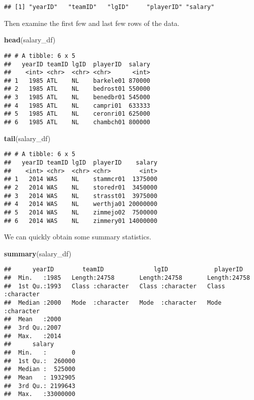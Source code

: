 \documentclass[]{article}
\newenvironment{Shaded}{\begin{snugshade}}{\end{snugshade}}
\newcommand{\KeywordTok}[1]{\textcolor[rgb]{0.13,0.29,0.53}{\textbf{#1}}}
\newcommand{\NormalTok}[1]{#1}
\begin{document}
\begin{verbatim}
## [1] "yearID"   "teamID"   "lgID"     "playerID" "salary"
\end{verbatim}

Then examine the first few and last few rows of the data.

\begin{Shaded}
\begin{Highlighting}[]
\KeywordTok{head}\NormalTok{(salary_df)}
\end{Highlighting}
\end{Shaded}

\begin{verbatim}
## # A tibble: 6 x 5
##   yearID teamID lgID  playerID  salary
##    <int> <chr>  <chr> <chr>      <int>
## 1   1985 ATL    NL    barkele01 870000
## 2   1985 ATL    NL    bedrost01 550000
## 3   1985 ATL    NL    benedbr01 545000
## 4   1985 ATL    NL    campri01  633333
## 5   1985 ATL    NL    ceronri01 625000
## 6   1985 ATL    NL    chambch01 800000
\end{verbatim}

\begin{Shaded}
\begin{Highlighting}[]
\KeywordTok{tail}\NormalTok{(salary_df)}
\end{Highlighting}
\end{Shaded}

\begin{verbatim}
## # A tibble: 6 x 5
##   yearID teamID lgID  playerID    salary
##    <int> <chr>  <chr> <chr>        <int>
## 1   2014 WAS    NL    stammcr01  1375000
## 2   2014 WAS    NL    storedr01  3450000
## 3   2014 WAS    NL    strasst01  3975000
## 4   2014 WAS    NL    werthja01 20000000
## 5   2014 WAS    NL    zimmejo02  7500000
## 6   2014 WAS    NL    zimmery01 14000000
\end{verbatim}

We can quickly obtain some summary statistics.

\begin{Shaded}
\begin{Highlighting}[]
\KeywordTok{summary}\NormalTok{(salary_df)}
\end{Highlighting}
\end{Shaded}

\begin{verbatim}
##      yearID        teamID              lgID             playerID        
##  Min.   :1985   Length:24758       Length:24758       Length:24758      
##  1st Qu.:1993   Class :character   Class :character   Class :character  
##  Median :2000   Mode  :character   Mode  :character   Mode  :character  
##  Mean   :2000                                                           
##  3rd Qu.:2007                                                           
##  Max.   :2014                                                           
##      salary        
##  Min.   :       0  
##  1st Qu.:  260000  
##  Median :  525000  
##  Mean   : 1932905  
##  3rd Qu.: 2199643  
##  Max.   :33000000
\end{verbatim}
\end{document}
